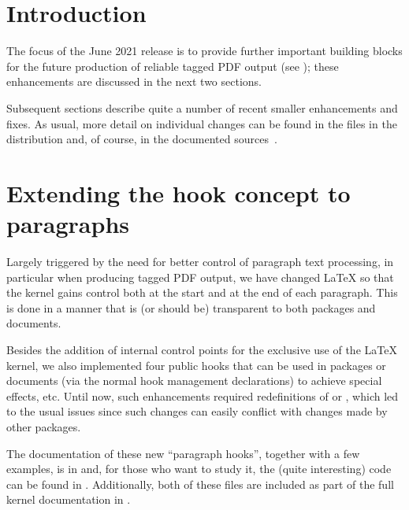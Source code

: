 \documentclass{ltnews}
\providecommand\tubcommand[1]{}
\begin{document}
\tubcommand{\addtolength\textheight{4.2pc}}   %

\maketitle
{ \spaceskip=3.33pt  \tableofcontents}

\setlength{}


\medskip


\section{Introduction}

The focus of the June 2021 release is to provide further important
building blocks for the future production of
reliable tagged PDF output
(see \cite{33:blueprint}); these enhancements
are discussed in the next two
sections. 

Subsequent sections describe quite a number of recent smaller
enhancements and fixes.  As usual, more detail on individual changes
can be found in the  files in the distribution
and, of course, in the documented sources~\cite{33:source2e}.



\section{Extending the hook concept to paragraphs}

Largely triggered by the need for better control of paragraph text
processing, in particular when producing tagged PDF output, we have
changed \LaTeX{} so that the kernel gains control both at the start
and at the end of each paragraph. This is done in a manner that is (or
should be) transparent to both packages and documents.

Besides the addition of internal control points for the exclusive use
of the \LaTeX{} kernel, we also implemented four public hooks that can
be used in packages or documents (via the normal hook management
declarations) to achieve special effects, etc.  Until now, such
enhancements required redefinitions of  or ,
which led to the usual issues since such changes can easily conflict
with changes made by other packages.

The documentation of these new \enquote{paragraph hooks}, together
with a few examples, is in  and, for those who
want to study it, the (quite interesting) code can be found in
. Additionally, both of these files are included
as part of the full kernel documentation in .
\end{document}
